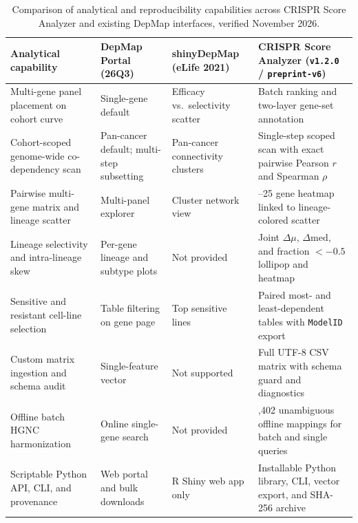 \documentclass[11pt,a4paper]{article}
\begin{document}
\begin{table}[t]
\centering
\footnotesize
\caption{Comparison of analytical and reproducibility capabilities across CRISPR Score Analyzer and existing DepMap interfaces, verified November 2026.}
\label{tab:comparison}
\begin{tabularx}{\textwidth}{>{\raggedright\arraybackslash}p{3.4cm} >{\raggedright\arraybackslash}X >{\raggedright\arraybackslash}p{2.9cm} >{\raggedright\arraybackslash}X}
\toprule
\textbf{Analytical capability} & \textbf{DepMap Portal (26Q3)} & \textbf{shinyDepMap (eLife 2021)} & \textbf{CRISPR Score Analyzer (\texttt{v1.2.0} / \texttt{preprint-v6})} \\
\midrule
Multi-gene panel placement on cohort curve & Single-gene default & Efficacy vs.\ selectivity scatter & Batch ranking and two-layer gene-set annotation \\
Cohort-scoped genome-wide co-dependency scan & Pan-cancer default; multi-step subsetting & Pan-cancer connectivity clusters & Single-step scoped scan with exact pairwise Pearson $r$ and Spearman $\rho$ \\
Pairwise multi-gene matrix and lineage scatter & Multi-panel explorer & Cluster network view & 2--25 gene heatmap linked to lineage-colored scatter \\
Lineage selectivity and intra-lineage skew & Per-gene lineage and subtype plots & Not provided & Joint $\Delta\mu$, $\Delta\mathrm{med}$, and fraction $< -0.5$ lollipop and heatmap \\
Sensitive and resistant cell-line selection & Table filtering on gene page & Top sensitive lines & Paired most- and least-dependent tables with \texttt{ModelID} export \\
Custom matrix ingestion and schema audit & Single-feature vector & Not supported & Full UTF-8 CSV matrix with schema guard and diagnostics \\
Offline batch HGNC harmonization & Online single-gene search & Not provided & 40,402 unambiguous offline mappings for batch and single queries \\
Scriptable Python API, CLI, and provenance & Web portal and bulk downloads & R Shiny web app only & Installable Python library, CLI, vector export, and SHA-256 archive \\
\bottomrule
\end{tabularx}
\end{table}
\end{document}
